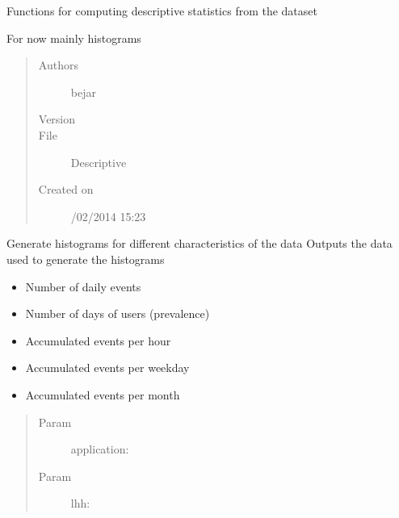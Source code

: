 \documentclass[letterpaper,10pt,english]{sphinxmanual}
\begin{document}
Functions for computing descriptive statistics from the dataset

For now mainly histograms
\begin{quote}\begin{description}
\item[{Authors}] \leavevmode
bejar

\item[{Version}] 

\item[{File}] \leavevmode
Descriptive

\item[{Created on}] /02/2014 15:23

\end{description}\end{quote}

\begin{fulllineitems}
\label{index:SuperHub.Descriptive.data_histograms}
Generate histograms for different characteristics of the data
Outputs the data used to generate the histograms
\begin{itemize}
\item {} 
Number of daily events

\item {} 
Number of days of users (prevalence)

\item {} 
Accumulated events per hour

\item {} 
Accumulated events per weekday

\item {} 
Accumulated events per month

\end{itemize}
\begin{quote}\begin{description}
\item[{Param }] \leavevmode
application:

\item[{Param }] \leavevmode
lhh:

\end{description}\end{quote}

\end{fulllineitems}
\end{document}
